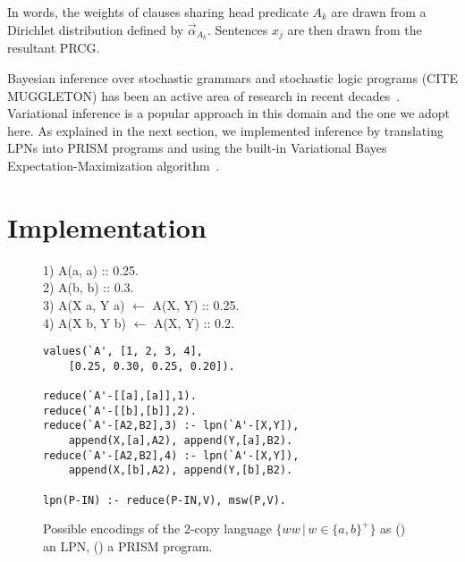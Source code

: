 \documentclass[10pt, twocolumn]{article}
\begin{document}
In words, the weights of clauses sharing head predicate $A_k$ are drawn from a Dirichlet distribution defined by $\vec{\alpha}_{A_k}$. Sentences $x_j$ are then drawn from the resultant PRCG.

Bayesian inference over stochastic grammars
and stochastic logic programs (CITE MUGGLETON) has been an active area of
research in recent decades~\cite{DBLP:conf/emnlp/LiangPJK07,
  goldwater2006contextual, johnson2006adaptor, cussens2001parameter}.
Variational inference is a popular approach in this domain and the one
we adopt here. As explained in the next section, we implemented
inference by translating LPNs into PRISM programs and using the
built-in Variational Bayes Expectation-Maximization
algorithm~\cite{sato2008variational}. 

\vspace{-1em}
\section{Implementation \label{sec:implementation}}


\begin{figure}[t]
	\centering
	\begin{minipage}[b]{0.8\linewidth}
1) A(a, a) :: 0.25. \\
2) A(b, b) :: 0.3. \\
3) A(X a, Y a) $\leftarrow$ A(X, Y) :: 0.25. \\
4) A(X b, Y b) $\leftarrow$ A(X, Y) :: 0.2.
		\subcaption{}
		\label{fig:grammar}
	\end{minipage}
	\begin{minipage}[b]{0.8\linewidth}
        \fontsize{9}{10.5}\selectfont\ttfamily
		\begin{verbatim}
values(`A', [1, 2, 3, 4],
    [0.25, 0.30, 0.25, 0.20]).

reduce(`A'-[[a],[a]],1).
reduce(`A'-[[b],[b]],2).
reduce(`A'-[A2,B2],3) :- lpn(`A'-[X,Y]),
    append(X,[a],A2), append(Y,[a],B2).
reduce(`A'-[A2,B2],4) :- lpn(`A'-[X,Y]),
    append(X,[b],A2), append(Y,[b],B2).

lpn(P-IN) :- reduce(P-IN,V), msw(P,V).
		\end{verbatim}
		\subcaption{}
		\label{fig:prism}
	\end{minipage}
	\caption{Possible encodings of the 2-copy language $\{ww\,|\, w \in \{a,b\}^+\}$ as () an LPN, () a PRISM program.}
	\label{fig:copy}
\end{figure}
\end{document}
